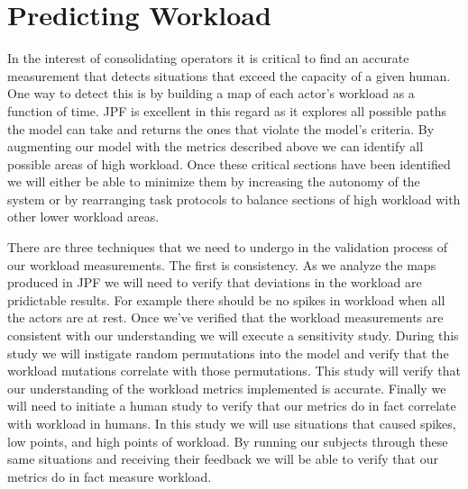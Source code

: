 \section{Predicting Workload}
	In the interest of consolidating operators it is critical to find an accurate measurement that detects situations that exceed the capacity of a given human. One way to detect this is by building a map of each actor's workload as a function of time. JPF is excellent in this regard as it explores all possible paths the model can take and returns the ones that violate the model's criteria. By augmenting our model with the metrics described above we can identify all possible areas of high workload. Once these critical sections have been identified we will either be able to minimize them by increasing the autonomy of the system or by rearranging task protocols to balance sections of high workload with other lower workload areas.

There are three techniques that we need to undergo in the validation process of our workload measurements. The first is consistency. As we analyze the maps produced in JPF we will need to verify that deviations in the workload are pridictable results. For example there should be no spikes in workload when all the actors are at rest. Once we've verified that the workload measurements are consistent with our understanding we will execute a sensitivity study. During this study we will instigate random permutations into the model and verify that the workload mutations correlate with those permutations. This study will verify that our understanding of the workload metrics implemented is accurate. Finally we will need to initiate a human study to verify that our metrics do in fact correlate with workload in humans. In this study we will use situations that caused spikes, low points, and high points of workload. By running our subjects through these same situations and receiving their feedback we will be able to verify that our metrics do in fact measure workload.